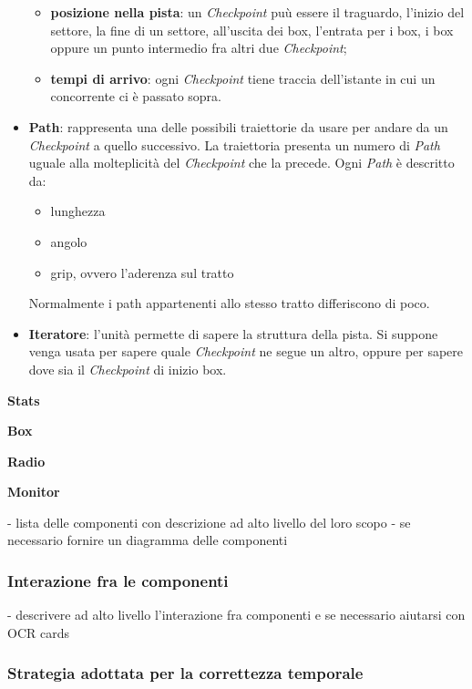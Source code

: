 \begin{description}
\begin{itemize}
\begin{itemize}
\item \textbf{posizione nella pista}: un \emph{Checkpoint} pu\`{u} essere il traguardo, l'inizio del settore, la fine di un settore, all'uscita dei box, l'entrata
					per i box, i box oppure un punto intermedio fra altri due \emph{Checkpoint};
\item \textbf{tempi di arrivo}: ogni \emph{Checkpoint} tiene traccia dell'istante in cui un concorrente ci \`{e} passato sopra.
\end{itemize}
\item \textbf{Path}: rappresenta una delle possibili traiettorie da usare per andare da un \emph{Checkpoint} a quello successivo. La traiettoria presenta
	un numero di \emph{Path} uguale alla molteplicit\`{a} del \emph{Checkpoint} che la precede. Ogni \emph{Path} \`{e} descritto da:
	\begin{itemize}
		\item lunghezza
		\item angolo
		\item grip, ovvero l'aderenza sul tratto
	\end{itemize}
Normalmente i path appartenenti allo stesso tratto differiscono di poco.
\item \textbf{Iteratore}: l'unit\`{a} permette di sapere la struttura della pista. Si suppone venga usata per sapere quale \emph{Checkpoint} ne segue un altro,
	oppure per sapere dove sia il \emph{Checkpoint} di inizio box. 
\end{itemize}
\item{\textbf{Stats}}\\
\item{\textbf{Box}}\\
\item{\textbf{Radio}}\\
\item{\textbf{Monitor}}\\
\end{description}
 - lista delle componenti con descrizione ad alto livello del loro scopo
 - se necessario fornire un diagramma delle componenti
\subsubsection{Interazione fra le componenti}
 - descrivere ad alto livello l'interazione fra componenti e se necessario aiutarsi con OCR cards
\subsubsection{Strategia adottata per la correttezza temporale}
